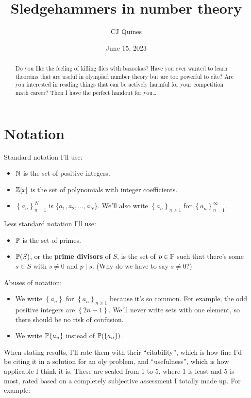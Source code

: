 \documentclass[11pt,paper=letter]{scrartcl}
\newcommand{\seq}[1]{\left\{#1\right\}}
\newcommand{\primedivs}[1]{\PP\!\left(#1\right)}
\newcommand{\primeseq}[1]{\PP\!\seq{#1}}
\begin{document}
\title{Sledgehammers in number theory}
\author{CJ Quines}
\date{June 15, 2023}

\maketitle

\begin{abstract}
Do you like the feeling of killing flies with bazookas? Have you ever wanted to learn theorems that are useful in olympiad number theory but are too powerful to cite? Are you interested in reading things that can be actively harmful for your competition math career? Then I have the perfect handout for you\dots
\end{abstract}

\section{Notation}

Standard notation I'll use:
\begin{itemize}
\item $\mathbb N$ is the set of positive integers.
\item $\mathbb Z[x]$ is the set of polynomials with integer coefficients.
\item $\seq{a_n}_{n = 1}^N$ is $\{a_1, a_2, \ldots, a_N\}$. We'll also write $\seq{a_n}_{n \ge 1}$ for $\seq{a_n}_{n = 1}^{\infty}$.
\end{itemize}
Less standard notation I'll use:
\begin{itemize}
\item $\mathbb P$ is the set of primes.
\item $\mathbb P(S)$, or the \textbf{prime divisors} of $S$, is the set of $p \in \mathbb P$ such that there's some $s \in S$ with $s \ne 0$ and $p \mid s$. (Why do we have to say $s \ne 0$?)
\end{itemize}
Abuses of notation:
\begin{itemize}
\item We write $\seq{a_n}$ for $\seq{a_n}_{n \ge 1}$ because it's so common. For example, the odd positive integers are $\seq{2n - 1}$. We'll never write sets with one element, so there should be no risk of confusion.
\item We write $\primeseq{a_n}$ instead of $\primedivs{\seq{a_n}}$.
\end{itemize}

When stating results, I'll rate them with their ``citability'', which is how fine I'd be citing it in a solution for an oly problem, and ``usefulness'', which is how applicable I think it is. These are scaled from 1 to 5, where 1 is least and 5 is most, rated based on a completely subjective assessment I totally made up. For example:
\end{document}
